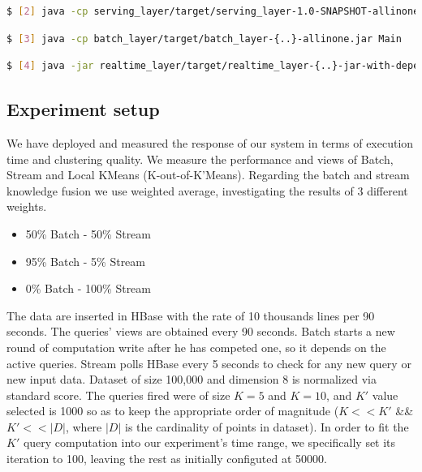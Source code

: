 \documentclass{lmproj}
\begin{document}
\begin{lstlisting}[language=bash]
$ [2] java -cp serving_layer/target/serving_layer-1.0-SNAPSHOT-allinone.jar {option -f with a given queries file}
\end{lstlisting}

\begin{lstlisting}[language=bash]
$ [3] java -cp batch_layer/target/batch_layer-{..}-allinone.jar Main
\end{lstlisting}

\begin{lstlisting}[language=bash]
$ [4] java -jar realtime_layer/target/realtime_layer-{..}-jar-with-dependencies.jar
\end{lstlisting}


\subsection{Experiment setup}

We have deployed and measured the response of our system in terms of execution time and clustering quality. We measure the performance and views of Batch, Stream and Local KMeans (K-out-of-K'Means). Regarding the batch and stream knowledge fusion we use weighted average, investigating the results of 3 different weights.

\begin{itemize}
	\item 50\% Batch - 50\% Stream
	\item 95\% Batch - 5\% Stream
	\item 0\% Batch - 100\% Stream
\end{itemize}

The data are inserted in HBase with the rate of 10 thousands lines per 90 seconds. The queries' views are obtained every 90 seconds. Batch starts a new round of computation write after he has competed one, so it depends on the active queries. Stream polls HBase every 5 seconds to check for any new query or new input data. Dataset of size 100,000 and dimension 8 is normalized via standard score. The queries fired were of size $K = 5$ and $K = 10$, and $K'$ value selected is 1000 so as to keep the appropriate order of magnitude ($K<<K'$ \&\& $K'<<|D|$, where $|D|$ is the cardinality of points in dataset). In order to fit the $K'$ query computation into our experiment's time range, we specifically set its iteration to 100, leaving the rest as initially configuted at 50000.
\end{document}
